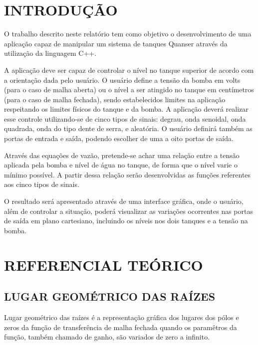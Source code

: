 \documentclass[a4paper,12pt]{article}
\begin{document}
\newpage


\thispagestyle{main}

\section{INTRODUÇÃO}

\begin{flushleft}
\hspace{4ex}O trabalho descrito neste relatório tem como objetivo o desenvolvimento de uma aplicação capaz de manipular um sistema de tanques Quanser através da utilização da linguagem C++.

A aplicação deve ser capaz de controlar o nível no tanque superior de acordo com a orientação dada pelo usuário. O usuário define a tensão da bomba em volts (para o caso de malha aberta) ou o nível a ser atingido no tanque em centímetros (para o caso de malha fechada), sendo estabelecidos limites na aplicação respeitando os limites físicos do tanque e da bomba. A aplicação deverá realizar esse controle utilizando-se de cinco tipos de sinais: degrau, onda senoidal, onda quadrada, onda do tipo dente de serra, e aleatória. O usuário definirá também as portas de entrada e saída, podendo escolher de uma a oito portas de saída.

Através das equações de vazão, pretende-se achar uma relação entre a tensão aplicada pela bomba e nível de água no tanque, de forma que o nível varie o mínimo possível. A partir dessa relação serão desenvolvidas as funções referentes aos cinco tipos de sinais.

O resultado será apresentado através de uma interface gráfica, onde o usuário, além de controlar a situação, poderá visualizar as variações ocorrentes nas portas de saída em plano cartesiano, incluindo os níveis nos dois tanques e a tensão na bomba.
\end{flushleft}

\newpage


\thispagestyle{main}

\section{REFERENCIAL TEÓRICO}

\subsection{LUGAR GEOMÉTRICO DAS RAÍZES}
\hspace{4ex}Lugar geométrico das raízes é a representação gráfica dos lugares dos pólos e zeros da função de transferência de malha fechada quando os paramêtros da função, também chamado de ganho, são variados de zero a infinito.
 
\end{document}

